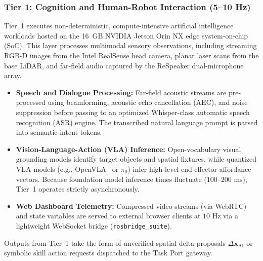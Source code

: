\subsubsection{Tier 1: Cognition and Human-Robot Interaction (5--10 Hz)}
Tier~1 executes non-deterministic, compute-intensive artificial intelligence workloads hosted on the 16~GB NVIDIA Jetson Orin NX edge system-on-chip (SoC). This layer processes multimodal sensory observations, including streaming RGB-D images from the Intel RealSense head camera, planar laser scans from the base LiDAR, and far-field audio captured by the ReSpeaker dual-microphone array.
\begin{itemize}[leftmargin=1.5em]
  \item \textbf{Speech and Dialogue Processing:} Far-field acoustic streams are pre-processed using beamforming, acoustic echo cancellation (AEC), and noise suppression before passing to an optimized Whisper-class automatic speech recognition (ASR) engine. The transcribed natural language prompt is parsed into semantic intent tokens.
  \item \textbf{Vision-Language-Action (VLA) Inference:} Open-vocabulary visual grounding models identify target objects and spatial fixtures, while quantized VLA models (e.g., OpenVLA~\cite{openvla} or $\pi_0$) infer high-level end-effector affordance vectors. Because foundation model inference times fluctuate ($100\text{--}200\text{ ms}$), Tier~1 operates strictly asynchronously.
  \item \textbf{Web Dashboard Telemetry:} Compressed video streams (via WebRTC) and state variables are served to external browser clients at $10\text{ Hz}$ via a lightweight WebSocket bridge (\texttt{rosbridge\_suite}).
\end{itemize}
Outputs from Tier~1 take the form of unverified spatial delta proposals $\Delta\mathbf{x}_{\text{AI}}$ or symbolic skill action requests dispatched to the Task Port gateway.

